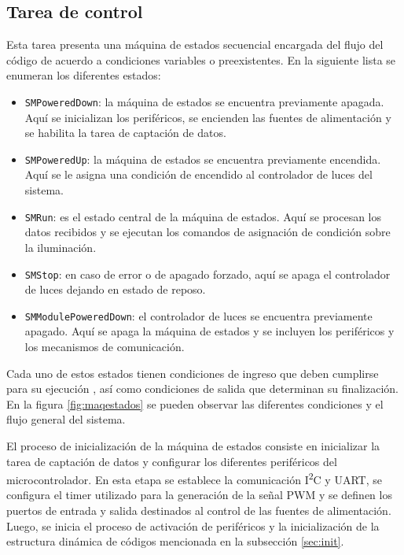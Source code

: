 \subsection{Tarea de control}
\label{sec:control}
Esta tarea presenta una máquina de estados secuencial encargada del flujo del código de acuerdo a condiciones variables o preexistentes. En la siguiente lista se enumeran los diferentes estados:
\begin{itemize}
    \item {\texttt{SMPoweredDown}}: la máquina de estados se encuentra previamente apagada. Aquí se inicializan los periféricos, se encienden las fuentes de alimentación y se habilita la tarea de captación de datos.
    \item {\texttt{SMPoweredUp}}: la máquina de estados se encuentra previamente encendida. Aquí se le asigna una condición de encendido al controlador de luces del sistema.
    \item {\texttt{SMRun}}: es el estado central de la máquina de estados. Aquí se procesan los datos recibidos y se ejecutan los comandos de asignación de condición sobre la iluminación.
    \item {\texttt{SMStop}}: en caso de error o de apagado forzado, aquí se apaga el controlador de luces dejando en estado de reposo.
    \item {\texttt{SMModulePoweredDown}}: el controlador de luces se encuentra previamente apagado. Aquí se apaga la máquina de estados y se incluyen los periféricos y los mecanismos de comunicación.
\end{itemize}

Cada uno de estos estados tienen condiciones de ingreso que deben cumplirse para su ejecución , así como condiciones de salida que determinan su finalización. En la figura \ref{fig:maqestados} se pueden observar las diferentes condiciones y el flujo general del sistema.
    
El proceso de inicialización de la máquina de estados consiste en inicializar la tarea de captación de datos y  configurar los diferentes periféricos del microcontrolador. En esta etapa se establece la comunicación I\textsuperscript{2}C y UART, se configura el timer utilizado para la generación de la señal PWM y se definen los puertos de entrada y salida destinados al control de las fuentes de alimentación. Luego, se inicia el proceso de activación de periféricos y la inicialización de la estructura dinámica de códigos mencionada en la subsección \ref{sec:init}. 

